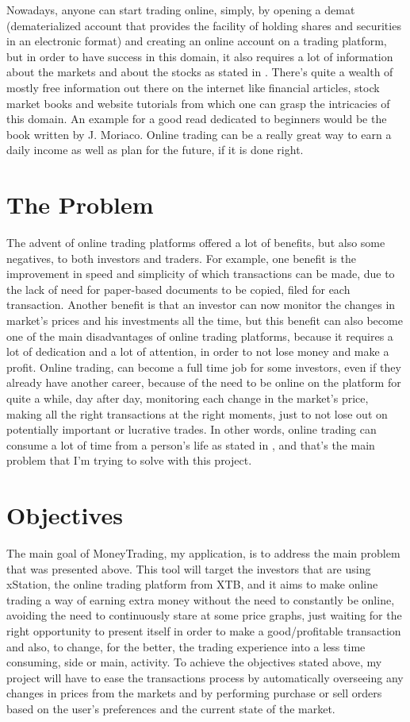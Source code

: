 \documentclass[12pt,a4paper]{report}
\begin{document}
Nowadays, anyone can start trading online, simply, by opening a demat (dematerialized account that provides the facility of holding shares and securities in an electronic format) and creating an online account on a trading platform, but in order to have success in this domain, it also requires a lot of information about the markets and about the stocks as stated in \cite{marketWizards}. There's quite a wealth of mostly free information out there on the internet like financial articles, stock market books and website tutorials from which one can grasp the intricacies of this domain. An example for a good read dedicated to beginners would be the book \cite{tutorial} written by J. Moriaco. Online trading can be a really great way to earn a daily income as well as plan for the future, if it is done right.

\section{The Problem} 
The advent of online trading platforms offered a lot of benefits, but also some negatives, to both investors and traders. For example, one benefit is the improvement in speed and simplicity of which transactions can be made, due to the lack of need for paper-based documents to be copied, filed for each transaction. Another benefit is that an investor can now monitor the changes in market's prices and his investments all the time, but this benefit can also become one of the main disadvantages of online trading platforms, because it requires a lot of dedication and a lot of attention, in order to not lose money and make a profit. Online trading, can become a full time job for some investors, even if they already have another career, because of the need to be online on the platform for quite a while, day after day, monitoring each change in the market's price, making all the right transactions at the right moments, just to not lose out on potentially important or lucrative trades. In other words, online trading can consume a lot of time from a person's life as stated in \cite{time}, and that's the main problem that I'm trying to solve with this project.        
\section{Objectives}
The main goal of MoneyTrading, my application, is to address the main problem that was presented above. This tool will target the investors that are using xStation, the online trading platform from XTB, and it aims to make online trading a way of earning extra money without the need to constantly be online, avoiding the need to continuously stare at some price graphs, just waiting for the right opportunity to present itself in order to make a good/profitable transaction and also, to change, for the better, the trading experience into a less time consuming, side or main, activity. To achieve the objectives stated above, my project will have to ease the transactions process by automatically overseeing any changes in prices from the markets and by performing purchase or sell orders based on the user's preferences and the current state of the market. 
\end{document}

